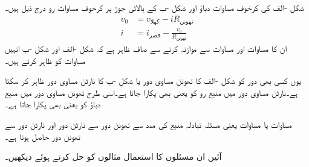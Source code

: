 شکل -الف کی کرخوف مساوات دباؤ اور شکل -ب کے بالائی جوڑ پر کرخوف مساوات رو درج ذیل ہیں۔
\begin{align*}
v_0&=v_{\text{کھلا}}-i R_{\text{تھونن}}\\
i&=i_{\text{قصر}}-\frac{v_0}{R_{\text{تھونن}}}
\end{align*}
ان کا مساوات  اور مساوات  سے موازنہ کرنے سے صاف ظاہر ہے کہ شکل -الف اور شکل -ب انہیں مساوات کو ظاہر کرتے ہیں۔

یوں کسی بھی دور کو شکل -الف کا تھونن مساوی دور یا شکل -ب کا نارٹن مساوی دور ظاہر کر سکتا ہے۔نارٹن مساوی دور میں منبع رو کو  یعنی  بھی پکارا جاتا ہے۔اسی طرح تھونن مساوی دور میں منبع دباؤ کو  یعنی  بھی پکارا جاتا ہے۔

مساوات  یا مساوات  یعنی مسئلہ تبادلہ منبع کی مدد سے تھونن دور سے نارٹن دور اور نارٹن دور سے تھونن دور حاصل ہوتا ہے۔

آئیں ان مسئلوں کا استعمال مثالوں کو حل کرتے ہوئے دیکھیں۔

